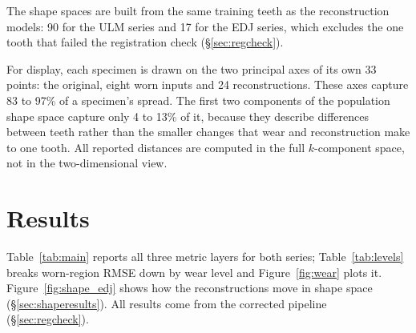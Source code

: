 \documentclass[10pt,a4paper,twocolumn]{article}
\begin{document}
The shape spaces are built from the same training teeth as the reconstruction
models: 90 for the ULM series and 17 for the EDJ series, which excludes the one
tooth that failed the registration check (\S\ref{sec:regcheck}).

For display, each specimen is drawn on the two principal axes of its own 33 points:
the original, eight worn inputs and 24 reconstructions. These axes capture 83 to
97\% of a specimen's spread. The first two components of the population shape
space capture only 4 to 13\% of it, because they describe differences between
teeth rather than the smaller changes that wear and reconstruction make to one
tooth. All reported distances are computed in the full $k$-component space, not in
the two-dimensional view.

\section{Results}
\label{sec:results}

Table~\ref{tab:main} reports all three metric layers for both series;
Table~\ref{tab:levels} breaks worn-region RMSE down by wear level and
Figure~\ref{fig:wear} plots it. Figure~\ref{fig:shape_edj} shows how the
reconstructions move in shape space (\S\ref{sec:shaperesults}). All results come
from the corrected pipeline (\S\ref{sec:regcheck}).
\end{document}
